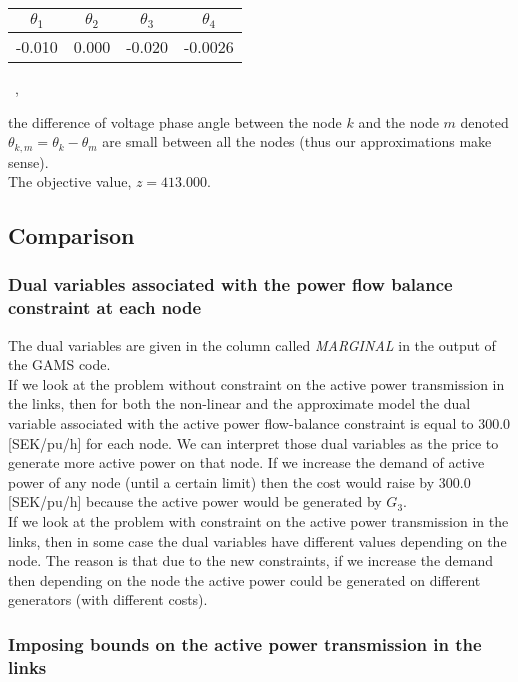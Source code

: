 \begin{table}[!h]
    \centering
\begin{tabular}{|c|c|c|c|}
  \hline
  $\theta_{1}$ & $\theta_{2}$ & $\theta_{3}$ & $\theta_{4}$ \\
  \hline
  -0.010 & 0.000 & -0.020 & -0.0026 \\
  \hline
\end{tabular} \ ,
\end{table}
\noindent
the difference of voltage phase angle between the node $k$ and the node $m$ denoted $\theta_{k,m} = \theta_k - \theta_m$ are small between all the nodes (thus our approximations make sense).\\

The objective value, $z = 413.000$.
\subsection{Comparison}

\subsubsection*{Dual variables associated with the power flow balance constraint at each node}

The dual variables are given in the column called \textit{MARGINAL} in the output of the GAMS code.\\

If we look at the problem without constraint on the active power transmission in the links, then for both the non-linear and the approximate model the dual variable associated with the active power flow-balance constraint is equal to $300.0$ [SEK/pu/h] for each node. We can interpret those dual variables as the price to generate more active power on that node. If we increase the demand of active power of any node (until a certain limit) then the cost would raise by $300.0$ [SEK/pu/h] because the active power would be generated by $G_3$.\\

If we look at the problem with constraint on the active power transmission in the links, then in some case the dual variables have different values depending on the node. The reason is that due to the new constraints, if we increase the demand then depending on the node the active power could be generated on different generators (with different costs).

\subsubsection*{Imposing bounds on the active power transmission in the links}

